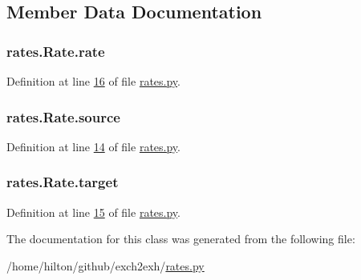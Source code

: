 \subsection{Member Data Documentation}
\subsubsection[{\texorpdfstring{rate}{rate}}]{\setlength{\rightskip}{0pt plus 5cm}rates.\+Rate.\+rate}\hypertarget{classrates_1_1_rate_a5a660cfdfaa515a6e5809492525d61a7}{}\label{classrates_1_1_rate_a5a660cfdfaa515a6e5809492525d61a7}


Definition at line \hyperlink{rates_8py_source_l00016}{16} of file \hyperlink{rates_8py_source}{rates.\+py}.

\subsubsection[{\texorpdfstring{source}{source}}]{\setlength{\rightskip}{0pt plus 5cm}rates.\+Rate.\+source}\hypertarget{classrates_1_1_rate_a82a6abb7536f2a4393f43456cfb1dc5e}{}\label{classrates_1_1_rate_a82a6abb7536f2a4393f43456cfb1dc5e}


Definition at line \hyperlink{rates_8py_source_l00014}{14} of file \hyperlink{rates_8py_source}{rates.\+py}.

\subsubsection[{\texorpdfstring{target}{target}}]{\setlength{\rightskip}{0pt plus 5cm}rates.\+Rate.\+target}\hypertarget{classrates_1_1_rate_adb1bbb0977c838106cb181a5941612c8}{}\label{classrates_1_1_rate_adb1bbb0977c838106cb181a5941612c8}


Definition at line \hyperlink{rates_8py_source_l00015}{15} of file \hyperlink{rates_8py_source}{rates.\+py}.



The documentation for this class was generated from the following file\+:\begin{DoxyCompactItemize}
\item 
/home/hilton/github/exch2exh/\hyperlink{rates_8py}{rates.\+py}\end{DoxyCompactItemize}
